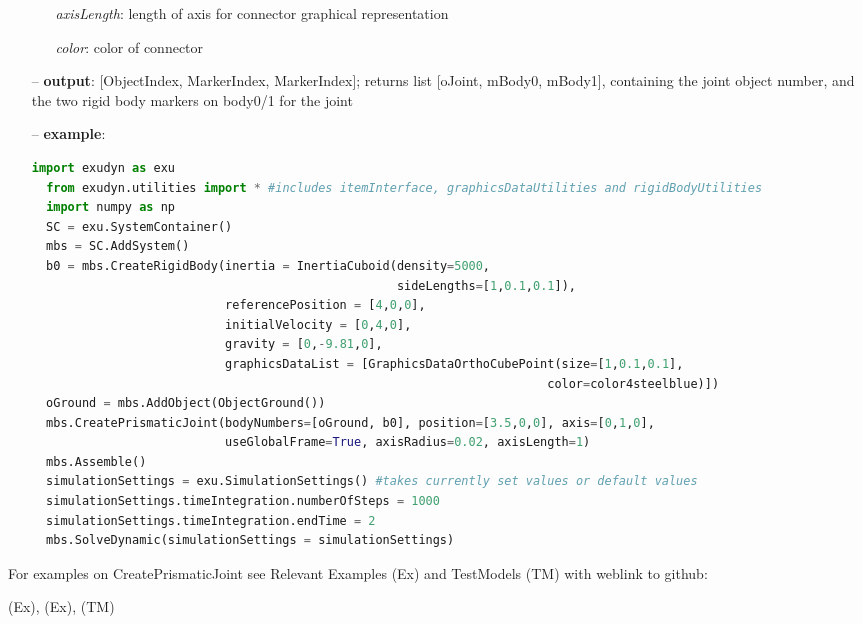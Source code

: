 \begin{itemize}[leftmargin=0.7cm]
\begin{itemize}[leftmargin=1.2cm]
\item[]{\it axisLength}: length of axis for connector graphical representation
\item[]{\it color}: color of connector
\end{itemize}
\item[--]
{\bf output}: [ObjectIndex, MarkerIndex, MarkerIndex]; returns list [oJoint, mBody0, mBody1], containing the joint object number, and the two rigid body markers on body0/1 for the joint
\item[--]
{\bf example}: \vspace{-12pt}\ei\begin{lstlisting}[language=Python, xleftmargin=36pt]
  import exudyn as exu
  from exudyn.utilities import * #includes itemInterface, graphicsDataUtilities and rigidBodyUtilities
  import numpy as np
  SC = exu.SystemContainer()
  mbs = SC.AddSystem()
  b0 = mbs.CreateRigidBody(inertia = InertiaCuboid(density=5000,
                                                   sideLengths=[1,0.1,0.1]),
                           referencePosition = [4,0,0],
                           initialVelocity = [0,4,0],
                           gravity = [0,-9.81,0],
                           graphicsDataList = [GraphicsDataOrthoCubePoint(size=[1,0.1,0.1],
                                                                        color=color4steelblue)])
  oGround = mbs.AddObject(ObjectGround())
  mbs.CreatePrismaticJoint(bodyNumbers=[oGround, b0], position=[3.5,0,0], axis=[0,1,0],
                           useGlobalFrame=True, axisRadius=0.02, axisLength=1)
  mbs.Assemble()
  simulationSettings = exu.SimulationSettings() #takes currently set values or default values
  simulationSettings.timeIntegration.numberOfSteps = 1000
  simulationSettings.timeIntegration.endTime = 2
  mbs.SolveDynamic(simulationSettings = simulationSettings)
\end{lstlisting}\vspace{-24pt}\bi\item[]\vspace{-24pt}\vspace{12pt}\end{itemize}
%

%
\noindent For examples on CreatePrismaticJoint see Relevant Examples (Ex) and TestModels (TM) with weblink to github:
\bi
 \item \footnotesize {} (Ex), 
 (Ex), 
 (TM)
\ei

